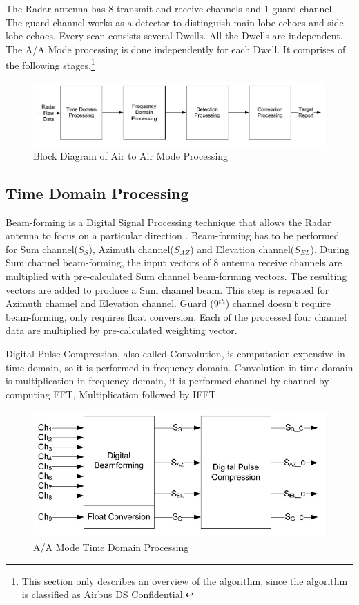 The Radar antenna has 8 transmit and receive channels and 1 guard channel. The guard channel works as a detector to distinguish main-lobe echoes and side-lobe echoes. Every scan consists several Dwells. All the Dwells are independent. The A/A Mode processing is done independently for each Dwell. It comprises of the following stages.\footnote{This section only describes an overview of the algorithm, since the algorithm is classified as Airbus DS Confidential.}

\begin{figure}[h!]
	\centering
	\includegraphics[width=160mm]{figures/aa_block_dia}
	\caption{Block Diagram of Air to Air Mode Processing}
	\label{fig:bg_related_work:aa_block_dia}
\end{figure}

\subsection{Time Domain Processing}
Beam-forming is a Digital Signal Processing technique that allows the Radar antenna to focus on a particular direction \cite{beamforming}. Beam-forming has to be performed for Sum channel($S_{S}$), Azimuth channel($S_{AZ}$) and Elevation channel($S_{EL}$). During Sum channel beam-forming, the input vectors of 8 antenna receive channels are multiplied with pre-calculated Sum channel beam-forming vectors. The resulting vectors are added to produce a Sum channel beam. This step is repeated for Azimuth channel and Elevation channel. Guard (9$^{th}$) channel doesn't require beam-forming, only requires float conversion. Each of the processed four channel data are multiplied by pre-calculated weighting vector. 

Digital Pulse Compression, also called Convolution, is computation expensive in time domain, so it is performed in frequency domain. Convolution in time domain is multiplication in frequency domain, it is performed channel by channel by computing FFT, Multiplication followed by IFFT.

\begin{figure}[h!]
	\centering
	\includegraphics[width=120mm]{figures/aa_tdp}
	\caption{A/A Mode Time Domain Processing}
	\label{fig:bg_related_work:aa_tdp}
\end{figure}


